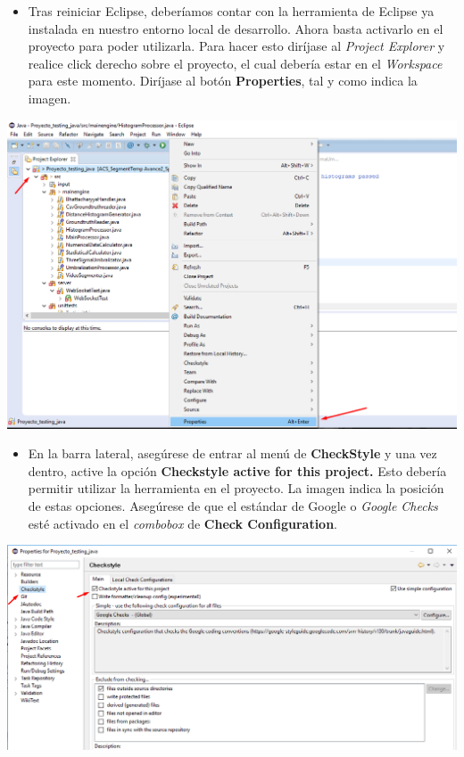 \documentclass[a4paper]{article}
\begin{document}
{\justify
\begin{itemize}
\item Tras reiniciar Eclipse, deberíamos contar con la herramienta de Eclipse ya instalada en nuestro entorno local de desarrollo. Ahora basta activarlo en el proyecto para poder utilizarla. Para hacer esto diríjase al \textit{Project Explorer} y realice click derecho sobre el proyecto, el cual debería estar en el \textit{Workspace} para este momento. Diríjase al botón \textbf{Properties}, tal y como indica la imagen.
\end{itemize} 
\centering
\includegraphics[scale=0.5]{Screenshot_CheckStyle_3.png}
\justify
\begin{itemize}
\item En la barra lateral, asegúrese de entrar al menú de \textbf{CheckStyle} y una vez dentro, active la opción \textbf{Checkstyle active for this project.} Esto debería permitir utilizar la herramienta en el proyecto. La imagen indica la posición de estas opciones. Asegúrese de que el estándar de Google o \textit{Google Checks} esté activado en el \textit{combobox} de \textbf{Check Configuration}.
\end{itemize} 
\centering
\includegraphics[scale=0.5]{Screenshot_CheckStyle_4.png}
}
\end{document}
